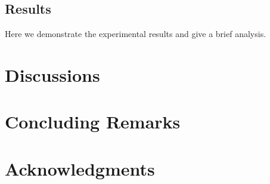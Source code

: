 \subsection{Results}
Here we demonstrate the experimental results and give a brief analysis.

\section{Discussions}

\section{Concluding Remarks}

\section{Acknowledgments}


